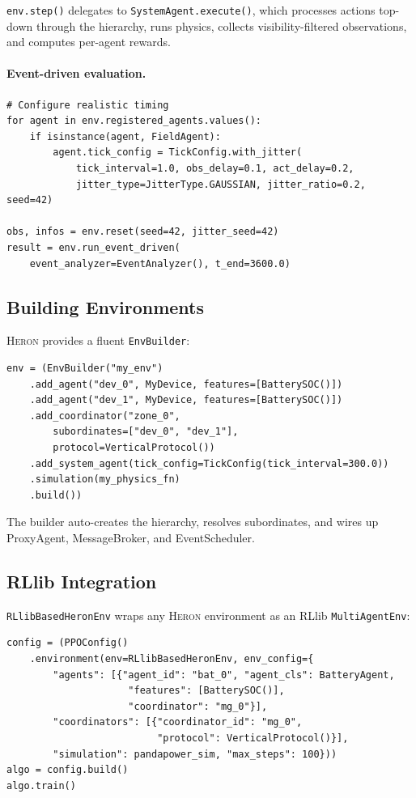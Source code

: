 \documentclass{article}
\newcommand{\heron}{\textsc{Heron}}
\begin{document}
\texttt{env.step()} delegates to \texttt{SystemAgent.execute()}, which processes actions top-down through the hierarchy, runs physics, collects visibility-filtered observations, and computes per-agent rewards.

\paragraph{Event-driven evaluation.}
\begin{lstlisting}
# Configure realistic timing
for agent in env.registered_agents.values():
    if isinstance(agent, FieldAgent):
        agent.tick_config = TickConfig.with_jitter(
            tick_interval=1.0, obs_delay=0.1, act_delay=0.2,
            jitter_type=JitterType.GAUSSIAN, jitter_ratio=0.2, seed=42)

obs, infos = env.reset(seed=42, jitter_seed=42)
result = env.run_event_driven(
    event_analyzer=EventAnalyzer(), t_end=3600.0)
\end{lstlisting}

\subsection{Building Environments}

\heron{} provides a fluent \texttt{EnvBuilder}:
\begin{lstlisting}
env = (EnvBuilder("my_env")
    .add_agent("dev_0", MyDevice, features=[BatterySOC()])
    .add_agent("dev_1", MyDevice, features=[BatterySOC()])
    .add_coordinator("zone_0",
        subordinates=["dev_0", "dev_1"],
        protocol=VerticalProtocol())
    .add_system_agent(tick_config=TickConfig(tick_interval=300.0))
    .simulation(my_physics_fn)
    .build())
\end{lstlisting}

The builder auto-creates the hierarchy, resolves subordinates, and wires up ProxyAgent, MessageBroker, and EventScheduler.

\subsection{RLlib Integration}

\texttt{RLlibBasedHeronEnv} wraps any \heron{} environment as an RLlib \texttt{MultiAgentEnv}:
\begin{lstlisting}
config = (PPOConfig()
    .environment(env=RLlibBasedHeronEnv, env_config={
        "agents": [{"agent_id": "bat_0", "agent_cls": BatteryAgent,
                     "features": [BatterySOC()],
                     "coordinator": "mg_0"}],
        "coordinators": [{"coordinator_id": "mg_0",
                          "protocol": VerticalProtocol()}],
        "simulation": pandapower_sim, "max_steps": 100}))
algo = config.build()
algo.train()
\end{lstlisting}
\end{document}
